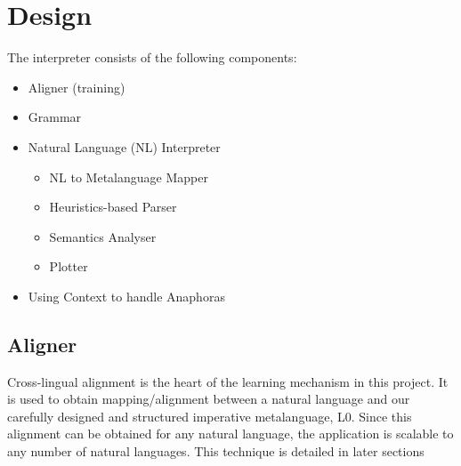 \def\DevnagVersion{2.15}\documentclass[12pt]{article}
\begin{document}
% 
% 
% 
% 

\section{Design}
The interpreter consists of the following components:
\begin{itemize}
\item Aligner (training)
\item Grammar
\item Natural Language (NL) Interpreter
  \begin{itemize}
    \item NL to Metalanguage Mapper
    \item Heuristics-based Parser
    \item Semantics Analyser
    \item Plotter  
  \end{itemize}
\item Using Context to handle Anaphoras
\end{itemize}

\subsection{Aligner}
Cross-lingual alignment is the heart of the learning mechanism in this project. It is used to obtain mapping/alignment between a natural language and our carefully designed and structured imperative metalanguage, L0. Since this alignment can be obtained for any natural language, the application is scalable to any number of natural languages. This technique is detailed in later sections\\
\end{document}
